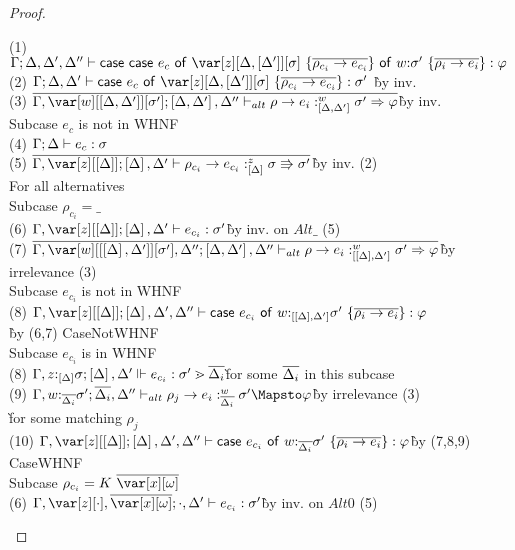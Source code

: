 
\CaseOfCaseTheorem

\begin{proof}~
\begin{tabbing}
    (1) $\G; \D, \D', \D'' \vdash \ccase{\ccase{e_c}{\zD~\{\ov{\rho_{c_i} \to e_{c_i}}\}}}{w{:}\s'~\{\ov{\rho_i \to e_i}\}} : \vp$\\
    (2) $\G; \D, \D' \vdash \ccase{e_c}{\zD~\{\ov{\rho_{c_i} \to e_{c_i}}\}} : \s'$ \`by inv.\\
    (3) $\ov{\G, \var[w][\irr{\D,\D'}][\s']; \irr{\D,\D'},\D'' \vdash_{alt} \rho \to e_i :^w_{\irr{\D,\D'}} \s' \Rightarrow \vp}$\`by inv.\\
    Subcase $e_c$ is not in WHNF\\
    (4) $\Gamma;\Delta \vdash e_c : \sigma$\\
    (5) $\ov{\G,\var[z][\irr{\D}]; \irr{\D}, \D' \vdash \rho_{c_i} \to e_{c_i} :^z_{\irr{\D}} \s \Rrightarrow \s'}$\`by inv. (2)\\
    For all alternatives\\
    Subcase $\rho_{c_i} = \_$\\
    (6) $\G,\var[z][\irr{\D}]; \irr{\D}, \D' \vdash e_{c_i} : \s'$\`by inv. on $Alt\_$ (5)\\
    (7) $\ov{\G, \var[w][\irr{\irr{\D},\D'}][\s'],\D''; \irr{\D,\D'},\D'' \vdash_{alt} \rho \to e_i :^w_{\irr{\irr{\D},\D'}} \s' \Rightarrow \vp}$\`by irrelevance (3)\\
    Subcase $e_{c_i}$ is not in WHNF\\
    (8) $\G,\var[z][\irr{\D}]; \irr{\D},\D',\D'' \vdash \ccase{e_{c_i}}{w{:}_{\irr{\irr{\D},\D'}}\s'~\{\ov{\rho_i \to e_i}\}} : \vp$\\\`by (6,7) CaseNotWHNF\\
    Subcase $e_{c_i}$ is in WHNF\\
    (8) $\Gamma,z{:}_{\left[\Delta\right]}\sigma; \left[\Delta\right],\Delta' \Vdash e_{c_i} : \sigma' \gtrdot \overline{\Delta_i}$\`for some $\overline{\Delta_i}$ in this subcase\\
    (9) $\G, w{:}_{\ov{\D_i}}\s'; \ov{\D_i}, \D'' \vdash_{alt} \rho_j \to e_i :^w_{\ov{\D_i}} \s' \Mapsto \vp$\`by irrelevance (3)\\\` for some matching $\rho_j$\\
    (10) $\G, \z[\irr{\D}]; \irr{\D},\D',\D'' \vdash \ccase{e_{c_i}}{w{:}_{\ov{\D_i}}\s'~\{\ov{\rho_i \to e_i}\}} : \vp$\` by (7,8,9) CaseWHNF\\
    Subcase $\rho_{c_i} = K~\ov{\xo}$\\
    (6) $\G,\z[\cdot], \ov{\xo} ; \cdot, \D' \vdash e_{c_i} : \s'$\`by inv. on $Alt0$ (5)\\

\end{tabbing}
\end{proof}
